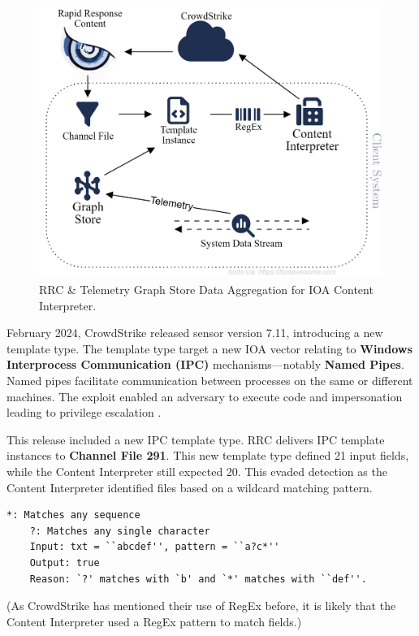 \begin{enumerate}
          \begin{figure}[h!]
              \centering
              \includegraphics[width=.65\textwidth]{Sections/crowd/rrc.png}
              \caption{RRC \& Telemetry Graph Store Data Aggregation for IOA Content Interpreter.}
              \label{fig:channelfile}
          \end{figure}
\end{enumerate}

\vspace{-1em}
February 2024, CrowdStrike released sensor version 7.11, introducing a new template type.
The template type target a new IOA vector relating to \textbf{Windows Interprocess Communication (IPC)} mechanisms---notably \textbf{Named Pipes}.
Named pipes facilitate communication between processes on the same or different machines.
The exploit enabled an adversary to execute code and impersonation leading to privilege escalation \cite{sandker_named_pipes_2021}.

This release included a new IPC template type. RRC delivers IPC template instances to \textbf{Channel File 291}. This
new template type defined 21 input fields, while the Content Interpreter still expected 20. This evaded detection
as the Content Interpreter identified files based on a wildcard matching pattern.

\begin{lstlisting}[caption=Wildcard Pattern Matching Example]
    *: Matches any sequence 
    ?: Matches any single character
    Input: txt = ``abcdef'', pattern = ``a?c*''
    Output: true
    Reason: `?' matches with `b' and `*' matches with ``def''.
\end{lstlisting}

\noindent
(As CrowdStrike has mentioned their use of RegEx before, it is likely that the Content Interpreter used a RegEx pattern to match fields.)

